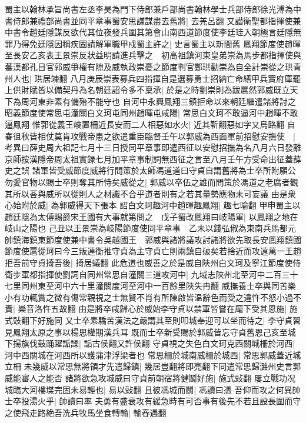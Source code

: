 蜀主以翰林承旨尚書左丞李昊為門下侍郎兼戶部尚書翰林學士兵部侍郎徐光溥為中書侍郎兼禮部尚書並同平章事蜀安思謙謀盡去舊將|{
	去羌呂翻}
又譛衛聖都指揮使兼中書令趙廷隱謀反欲代其位夜發兵圍其第會山南西道節度使李廷珪入朝極言廷隱無罪乃得免廷隱因稱疾固請解軍職甲戍蜀主許之|{
	史言蜀主以新間舊}
鳳翔節度使趙暉至長安乙亥表王景崇反狀益明請進兵擊之　初高祖鎮河東皇弟崇為馬步都指揮使與蕃漢都孔目官郭威爭權有隙及威執政崇憂之節度判官鄭珙勸崇為自全計崇從之珙青州人也|{
	珙居竦翻}
八月庚辰崇表募兵四指揮自是選募勇士招納亡命繕甲兵實府庫罷上供財賦皆以備契丹為名朝廷詔令多不稟承|{
	於是之時劉崇則為跋扈然郭威既立天下為周河東非素有備殆不能守也}
自河中永興鳳翔三鎮拒命以來朝廷繼遣諸將討之昭義節度使常思屯潼關白文珂屯同州趙暉屯咸陽|{
	常思白文珂不敢逼河中趙暉不敢逼鳳翔}
惟郭從義王峻置柵近長安而二人相惡如水火|{
	近其靳翻惡如字又烏路翻}
自春徂秋皆相仗莫肯攻戰帝患之欲遣重臣臨督壬午以郭威為西面軍前招慰安撫使　|{
	考異曰薛史周大祖記七月十三日授同平章事即遣西征以安慰招撫為名八月六日發離京師按漢隱帝周太祖實録七月加平章事制詞無西征之言至八月壬午方受命出征蓋薛史之誤}
諸軍皆受威節度威將行問策於太師馮道道曰守貞自謂舊將為士卒所附願公勿愛官物以賜士卒則奪其所恃矣威從之|{
	郭威以卒伍之雄而問策於馮道之老腐者觀其所以荅與威所以從則人之材識不合乎道者則有之若其量勢應物未可妄議}
由是衆心始附於威|{
	為郭威得天下張本}
詔白文珂趣河中趙暉趣鳳翔|{
	趣七喻翻}
甲申蜀主以趙廷隱為太傅賜爵宋王國有大事就第問之　戊子蜀改鳳翔曰岐陽軍|{
	以鳳翔之地在岐山之陽也}
己丑以王景崇為岐陽節度使同平章事　乙未以錢弘俶為東南兵馬都元帥鎮海鎮東節度使兼中書令吳越國王　郭威與諸將議攻討諸將欲先取長安鳳翔鎮國節度使扈從珂曰今三叛連衡推守貞為主守貞亡則兩鎮自破矣若捨近而攻遠萬一王趙拒吾前守貞掎吾後|{
	掎居蟻翻}
此危道也威善之於是威自陜州白文珂及寧江節度使侍衛步軍都指揮使劉詞自同州常思自潼關三道攻河中|{
	九域志陜州北至河中二百三十七里同州東至河中六十里潼關度河至河中一百餘里陜失冉翻}
威撫養士卒與同苦樂小有功輒賞之微有傷常親視之士無賢不肖有所陳啟皆温辭色而受之違忤不怒小過不責|{
	樂音洛忤五故翻}
由是將卒咸歸心於威始李守貞以禁軍皆嘗在麾下受其恩施|{
	施式䜴翻下好施同}
又士卒素驕苦漢法之嚴謂其至則叩城奉迎可以坐而待之|{
	李守貞習見鳳翔太原之事以楊思權期漢兵耳}
既而士卒新受賜於郭威皆忘守貞舊恩己亥至城下揚旗伐鼓踊躍詬譟|{
	詬古侯翻又許侯翻}
守貞視之失色白文珂克西關城柵於河西|{
	河中西關城在河西所以護蒲津浮梁者也}
常思柵於城南威柵於城西|{
	常思郭威蓋近城立柵}
未幾威以常思無將領才先遣歸鎮|{
	幾居豈翻將即亮翻下同遣常思歸潞州史言郭威能審人之能否}
諸將欲急攻城威曰守貞前朝宿將健鬭好施|{
	施式䜴翻}
屢立戰功况城臨大河樓堞完固未易輕也|{
	易以䜴翻}
且彼馮城而鬭|{
	馮讀曰憑}
吾仰而攻之何異帥士卒投湯火乎|{
	帥讀曰率}
夫勇有盛衰攻有緩急時有可否事有後先不若且設長圍而守之使飛走路絶吾洗兵牧馬坐食轉輸|{
	輸舂遇翻}
